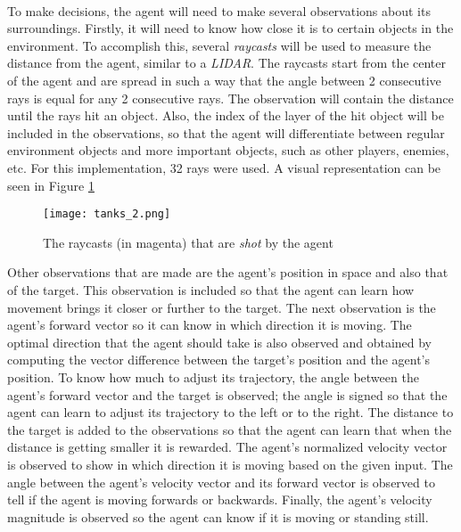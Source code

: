 \paragraph{}
To make decisions, the agent will need to make several observations about its surroundings. Firstly, it will need to know how close it is to certain objects in the environment. To accomplish this, several \emph{raycasts} will be used to measure the distance from the agent, similar to a \emph{LIDAR}. The raycasts start from the center of the agent and are spread in such a way that the angle between 2 consecutive rays is equal for any 2 consecutive rays. The observation will contain the distance until the rays hit an object. Also, the index of the layer of the hit object will be included in the observations, so that the agent will differentiate between regular environment objects and more important objects, such as other players, enemies, etc. For this implementation, 32 rays were used. A visual representation can be seen in Figure \ref{photo:tank_raycasts}

\begin{figure}
    \begin{center}
        \texttt{[image: tanks\_2.png]}
        \caption{The raycasts (in magenta) that are \emph{shot} by the agent}
        \label{photo:tank_raycasts}
    \end{center}
\end{figure}

Other observations that are made are the agent's position in space and also that of the target. This observation is included so that the agent can learn how movement brings it closer or further to the target. The next observation is the agent's forward vector so it can know in which direction it is moving. The optimal direction that the agent should take is also observed and obtained by computing the vector difference between the target's position and the agent's position. To know how much to adjust its trajectory, the angle between the agent's forward vector and the target is observed; the angle is signed so that the agent can learn to adjust its trajectory to the left or to the right. The distance to the target is added to the observations so that the agent can learn that when the distance is getting smaller it is rewarded. The agent's normalized velocity vector is observed to show in which direction it is moving based on the given input. The angle between the agent's velocity vector and its forward vector is observed to tell if the agent is moving forwards or backwards. Finally, the agent's velocity magnitude is observed so the agent can know if it is moving or standing still. 

